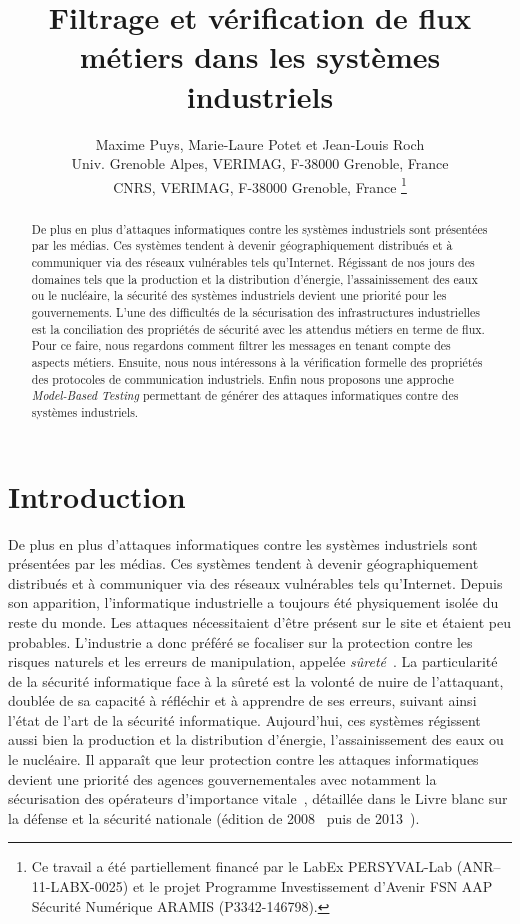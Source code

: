 \documentclass{article}
\title{Filtrage et vérification de flux métiers dans les systèmes industriels}
\author{
    Maxime Puys, Marie-Laure Potet et Jean-Louis Roch\\
    Univ. Grenoble Alpes, VERIMAG, F-38000 Grenoble, France\\
    CNRS, VERIMAG, F-38000 Grenoble, France
    \thanks{Ce travail a été partiellement financé par le LabEx PERSYVAL-Lab
    (ANR–11-LABX-0025) et le projet Programme Investissement d’Avenir FSN AAP
    Sécurité Numérique \no 3 ARAMIS (P3342-146798).}
}
\date{}
\begin{document}
\maketitle

\begin{abstract}
    De plus en plus d’attaques informatiques contre les systèmes industriels
    sont présentées par les médias.
    Ces systèmes tendent à devenir géographiquement distribués et à communiquer
    via des réseaux vulnérables tels qu’Internet.
    Régissant de nos jours des domaines tels que la production et la
    distribution d'énergie, l'assainissement des eaux ou le nucléaire, la
    sécurité des systèmes industriels devient une priorité pour les gouvernements.
    L'une des difficultés de la sécurisation des infrastructures industrielles est
    la conciliation des propriétés de sécurité avec les attendus métiers en
    terme de flux.
    Pour ce faire, nous regardons comment filtrer les messages en tenant compte
    des aspects métiers.
    Ensuite, nous nous intéressons à la vérification formelle des propriétés
    des protocoles de communication industriels.
    Enfin nous proposons une approche {\em Model-Based Testing} permettant de
    générer des attaques informatiques contre des systèmes industriels.
\end{abstract}

\section{Introduction}

De plus en plus d'attaques informatiques contre les systèmes industriels sont
présentées par les médias.
Ces systèmes tendent à devenir géographiquement distribués et à communiquer via
des réseaux vulnérables tels qu'Internet.
Depuis son apparition, l'informatique industrielle a toujours été physiquement
isolée du reste du monde.
Les attaques nécessitaient d'être présent sur le site et étaient peu probables.
L'industrie a donc préféré se focaliser sur la protection contre les risques
naturels et les erreurs de manipulation, appelée {\em sûreté}~\cite{Pie10,PS09,
IAEA96}.
La particularité de la sécurité informatique face à la sûreté est la volonté
de nuire de l'attaquant, doublée de sa capacité à réfléchir et à apprendre de
ses erreurs, suivant ainsi l'état de l'art de la sécurité informatique.
Aujourd'hui, ces systèmes régissent aussi bien la production et la distribution
d'énergie, l'assainissement des eaux ou le nucléaire.
Il apparaît que leur protection contre les attaques informatiques devient une
priorité des agences gouvernementales avec notamment la sécurisation des
opérateurs d'importance vitale~\cite{Leg07_oiv}, détaillée dans le Livre blanc
sur la défense et la sécurité nationale (édition de 2008~\cite{LivreBlanc08}
puis de 2013~\cite{LivreBlanc13}).
\end{document}

